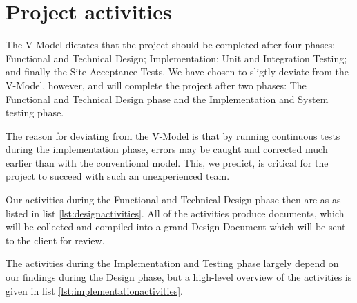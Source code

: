 \chapter{Project activities}
The V-Model dictates\cite{vmodel} that the project should be completed after four phases: Functional and Technical Design; Implementation; Unit and Integration Testing; and finally the Site Acceptance Tests. We have chosen to sligtly deviate from the V-Model, however, and will complete the project after two phases: The Functional and Technical Design phase and the Implementation and System testing phase.

The reason for deviating from the V-Model is that by running continuous tests during the implementation phase, errors may be caught and corrected much earlier than with the conventional model. This, we predict, is critical for the project to succeed with such an unexperienced team.

Our activities during the Functional and Technical Design phase then are as as listed in list \ref{lst:designactivities}. All of the activities produce documents, which will be collected and compiled into a grand Design Document which will be sent to the client for review.

The activities during the Implementation and Testing phase largely depend on our findings during the Design phase, but a high-level overview of the activities is given in list \ref{lst:implementationactivities}.

